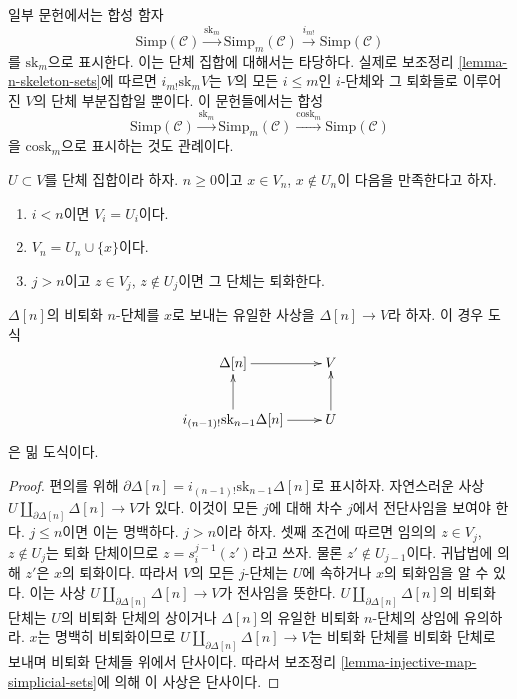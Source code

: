 \begin{remark}
\label{remark-sk-literature}
일부 문헌에서는 합성 함자
$$
\text{Simp}(\mathcal{C})
\xrightarrow{\text{sk}_m}
\text{Simp}_m(\mathcal{C})
\xrightarrow{i_{m!}}
\text{Simp}(\mathcal{C})
$$
를 $\text{sk}_m$으로 표시한다. 이는 단체 집합에 대해서는 타당하다.
실제로 보조정리 \ref{lemma-n-skeleton-sets}에 따르면
$i_{m!} \text{sk}_m V$는 $V$의 모든 $i \leq m$인 $i$-단체와 그 퇴화들로
이루어진 $V$의 단체 부분집합일 뿐이다. 이 문헌들에서는 합성
$$
\text{Simp}(\mathcal{C})
\xrightarrow{\text{sk}_m}
\text{Simp}_m(\mathcal{C})
\xrightarrow{\text{cosk}_m}
\text{Simp}(\mathcal{C})
$$
을 $\text{cosk}_m$으로 표시하는 것도 관례이다.
\end{remark}

\begin{lemma}
\label{lemma-glue-simplex}
$U \subset V$를 단체 집합이라 하자. $n \geq 0$이고
$x \in V_n$, $x \not \in U_n$이 다음을 만족한다고 하자.
\begin{enumerate}
\item $i < n$이면 $V_i = U_i$이다.
\item $V_n = U_n \cup \{x\}$이다.
\item $j > n$이고 $z \in V_j$, $z \not \in U_j$이면 그 단체는 퇴화한다.
\end{enumerate}
$\Delta[n]$의 비퇴화 $n$-단체를 $x$로 보내는 유일한 사상을
$\Delta[n] \to V$라 하자. 이 경우 도식
$$
\xymatrix{
\Delta[n] \ar[r] & V \\
i_{(n - 1)!} \text{sk}_{n - 1} \Delta[n] \ar[r] \ar[u] & U \ar[u]
}
$$
은 밂 도식이다.
\end{lemma}

\begin{proof}
편의를 위해 $\partial \Delta[n] = i_{(n - 1)!} \text{sk}_{n - 1} \Delta[n]$로
표시하자. 자연스러운 사상 $U \amalg_{\partial \Delta[n]} \Delta[n] \to V$가
있다. 이것이 모든 $j$에 대해 차수 $j$에서 전단사임을 보여야 한다.
$j \leq n$이면 이는 명백하다. $j > n$이라 하자. 셋째 조건에 따르면
임의의 $z \in V_j$, $z \not \in U_j$는 퇴화 단체이므로
$z = s^{j - 1}_i(z')$라고 쓰자. 물론 $z' \not \in U_{j - 1}$이다.
귀납법에 의해 $z'$은 $x$의 퇴화이다. 따라서 $V$의 모든 $j$-단체는
$U$에 속하거나 $x$의 퇴화임을 알 수 있다. 이는 사상
$U \amalg_{\partial \Delta[n]} \Delta[n] \to V$가 전사임을 뜻한다.
$U \amalg_{\partial \Delta[n]} \Delta[n]$의 비퇴화 단체는 $U$의 비퇴화
단체의 상이거나 $\Delta[n]$의 유일한 비퇴화 $n$-단체의 상임에 유의하라.
$x$는 명백히 비퇴화이므로
$U \amalg_{\partial \Delta[n]} \Delta[n] \to V$는 비퇴화 단체를 비퇴화
단체로 보내며 비퇴화 단체들 위에서 단사이다. 따라서 보조정리
\ref{lemma-injective-map-simplicial-sets}에 의해 이 사상은 단사이다.
\end{proof}

